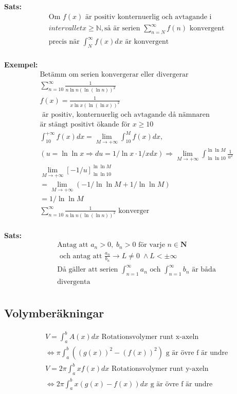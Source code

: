 \begin{multicols}{2}
\textbf{Sats: }
\begin{align*}
  &\text{Om $f(x)$ är positiv konternuerlig och avtagande i} \\
  &intervallet x\geq\mathbb{N}, \text{så är serien }  \displaystyle\sum_{n=N}^{\infty} f(n) \text{ konvergent} \\ 
  &\text{precis när  }  \int_N^{\infty} f(x)dx \text{ är konvergent} \\
\end{align*}

\textbf{Exempel: }
\begin{align*}
  &\text{Betämm om serien konvergerar eller divergerar} \\
  &\displaystyle\sum_{n=10}^{\infty} \frac{1}{n\ln{n}{(\ln{(\ln{n})})}^2} \\
  &f(x) = \frac{1}{x\ln{x}{(\ln{(\ln{x})})}^2} \\
  &\text{ är positiv, konternuerlig och avtagande då nämnaren} \\
  &\text{är stängt positivt ökande för } x \geq 10 \\
  &\int_{10}^{+\infty} f(x)dx = \lim_{M\to\mathbb{+\infty}} \int_{10}^{M} f(x)dx, \\
  &(u=\ln{\ln{x}} \Rightarrow du = 1/\ln{x} \cdot 1/x dx) 
  \Rightarrow \lim_{M\to+\infty} \int_{\ln{\ln{10}}}^{\ln{\ln{M}}} \frac{1}{u^2} \\
  &\lim_{M\to+\infty} {[-1/u]}_{\ln{\ln{10}}}^{\ln{\ln{M}}} \\
  &=\lim_{M\to+\infty} (-1/\ln{\ln{M}}+1/\ln{\ln{M}}) \\
  &=1/\ln{\ln{M}} \\
  &\displaystyle\sum_{n=10}^{\infty} \frac{1}{n\ln{n}{(\ln{(\ln{n})})}^2} \text{ konverger} \\
\end{align*}

\textbf{Sats: }
\begin{align*}
  &\text{Antag att } a_n >0, \; b_n >0 \text{ för varje } n \in \mathbf{N} \\
  &\text{ och antag att } \frac{a_n}{b_n}\to L \neq 0 \; \land L < \pm\infty \\
  &\text{Då gäller att serien } \int_{n=1}^{\infty}a_n \text{ och }
  \int_{n=1}^{\infty}b_n \text{ är båda} \\
  &\text{divergenta} \\
\end{align*}


\subsection{Volymberäkningar}
\begin{align*}
  &V = \int_a^b A(x)dx \text{ Rotationsvolymer runt x-axeln} \\
  &\Leftrightarrow \pi \int_a^b ({(g(x))}^2 - {(f(x))}^2) \text{ g är övre f är undre} \\
  &V = 2\pi \int_a^b xf(x)dx \text{ Rotationsvolymer runt y-axeln} \\
  &\Leftrightarrow 2\pi \int_a^b x(g(x)-f(x))dx \text{ g är övre f är undre}
\end{align*}


\end{multicols}
